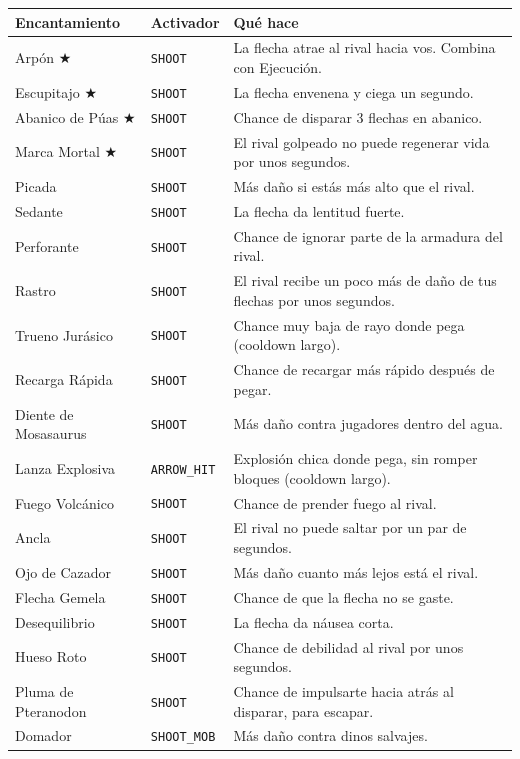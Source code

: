 \documentclass[11pt,a4paper]{article}
\newcommand{\tr}[1]{\texttt{\small #1}}           %
\newcommand{\rec}{\textcolor{rosa}{\textbf{$\bigstar$}}} %
\begin{document}
\begin{longtable}{L{3.5cm} L{3.4cm} L{8.6cm}}
\toprule
\textbf{Encantamiento} & \textbf{Activador} & \textbf{Qué hace}\\
\midrule
\endhead
Arpón \rec & \tr{SHOOT} & La flecha atrae al rival hacia vos. Combina con Ejecución.\\
Escupitajo \rec & \tr{SHOOT} & La flecha envenena y ciega un segundo.\\
Abanico de Púas \rec & \tr{SHOOT} & Chance de disparar 3 flechas en abanico.\\
Marca Mortal \rec & \tr{SHOOT} & El rival golpeado no puede regenerar vida por unos segundos.\\
Picada & \tr{SHOOT} & Más daño si estás más alto que el rival.\\
Sedante & \tr{SHOOT} & La flecha da lentitud fuerte.\\
Perforante & \tr{SHOOT} & Chance de ignorar parte de la armadura del rival.\\
Rastro & \tr{SHOOT} & El rival recibe un poco más de daño de tus flechas por unos segundos.\\
Trueno Jurásico & \tr{SHOOT} & Chance muy baja de rayo donde pega (cooldown largo).\\
Recarga Rápida & \tr{SHOOT} & Chance de recargar más rápido después de pegar.\\
Diente de Mosasaurus & \tr{SHOOT} & Más daño contra jugadores dentro del agua.\\
Lanza Explosiva & \tr{ARROW\_HIT} & Explosión chica donde pega, sin romper bloques (cooldown largo).\\
Fuego Volcánico & \tr{SHOOT} & Chance de prender fuego al rival.\\
Ancla & \tr{SHOOT} & El rival no puede saltar por un par de segundos.\\
Ojo de Cazador & \tr{SHOOT} & Más daño cuanto más lejos está el rival.\\
Flecha Gemela & \tr{SHOOT} & Chance de que la flecha no se gaste.\\
Desequilibrio & \tr{SHOOT} & La flecha da náusea corta.\\
Hueso Roto & \tr{SHOOT} & Chance de debilidad al rival por unos segundos.\\
Pluma de Pteranodon & \tr{SHOOT} & Chance de impulsarte hacia atrás al disparar, para escapar.\\
Domador & \tr{SHOOT\_MOB} & Más daño contra dinos salvajes.\\
\bottomrule
\end{longtable}
\end{document}
